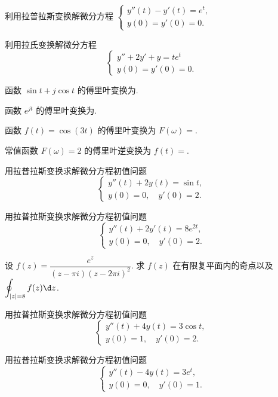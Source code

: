 \item 利用拉普拉斯变换解微分方程
$\begin{cases}
	y''(t)-y'(t)=e^t,&\\
	y(0)=y'(0)=0.&
\end{cases}$


\item 利用拉氏变换解微分方程 
\[\begin{cases}
y''+2y'+y=te^t&\\
y(0)=y'(0)=0.&
\end{cases}\]






\item 函数 $\sin t+j\cos t$ 的傅里叶变换为\fillblank{}.
\item 函数 $e^{jt}$ 的傅里叶变换为\fillblank{}.
\item 函数 $f(t)=\cos(3t)$ 的傅里叶变换为 $F(\omega)=$\fillblank{}.
\item 常值函数 $F(\omega)=2$ 的傅里叶逆变换为 $f(t)=$\fillblank{}.
\item 用拉普拉斯变换求解微分方程初值问题
\[\begin{cases}
y''(t)+2y(t)=\sin t,&\\
y(0)=0,\quad y'(0)=2.
\end{cases}\]
\item 用拉普拉斯变换求解微分方程初值问题
\[\begin{cases}
y''(t)+2y'(t)=8e^{2t},&\\
y(0)=0,\quad y'(0)=2.
\end{cases}\]
\item 设 $f(z)=\dfrac{e^z}{(z-\pi i)(z-2\pi i)^2}$. 求 $f(z)$ 在有限复平面内的奇点以及 $\displaystyle\oint_{|z|=8}f(z)\d z$.
\item 用拉普拉斯变换求解微分方程初值问题
\[\begin{cases}
y''(t)+4y(t)=3\cos t,&\\
y(0)=1,\quad y'(0)=2.
\end{cases}\]
\item 用拉普拉斯变换求解微分方程初值问题
\[\begin{cases}
y''(t)-4y(t)=3e^t,&\\
y(0)=0,\quad y'(0)=1.
\end{cases}\]
